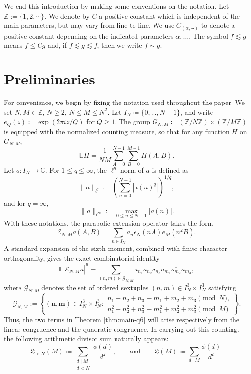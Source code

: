 \documentclass[11pt, twoside]{article}
\numberwithin{equation}{section}
\theoremstyle{definition}
\newcommand{\Z}{\mathbb Z}
\newcommand{\cG}{\mathcal G}
\begin{document}
We end this introduction by making some conventions on the notation. Let $\Z:=\{1,2,\cdots\}$. We denote by $C$ a positive constant
which is independent of the main parameters, 
but may vary from line to line. We use $C_{(\alpha,\cdots)}$ to denote a positive constant depending on the indicated parameters
$\alpha,\ldots$.  The symbol $f\lesssim g$ means $f\le C g$ and, if $f\lesssim g \lesssim f$, then we write $f\sim g$.
\section{Preliminaries}\label{sec:preliminaries}

For convenience, we begin by fixing the notation used throughout the paper. We set 
$N,M\in\Z$, $N\geq2$, $N\leq M\leq N^2$. 
Let \(I_N \coloneqq \{0,\ldots,N-1\}\), and write 
\(e_Q(z) \coloneqq \exp(2\pi i z/Q)\) for \(Q\ge 1\). 
The group \(G_{N,M} \coloneqq (\mathbb{Z}/N\mathbb{Z}) \times (\mathbb{Z}/M\mathbb{Z})\) 
is equipped with the normalized counting measure, so that for any function \(H\) on \(G_{N,M}\),
$$
\mathbb{E} H = \frac{1}{NM}\sum_{A=0}^{N-1}\sum_{B=0}^{M-1} H(A,B).
$$
Let $a:I_N\rightarrow\mathbb{C}$. For \(1\le q\le \infty\), the \(\ell^q\)-norm of $a$ is defined as
$$
\|a\|_{\ell^q}:=\left(\sum_{n=0}^{N-1}|a(n)^q|\right)^{1/q},
$$
and for $q=\infty$,
$$
\|a\|_{\ell^\infty}:=\max_{0\le n\le N-1}|a(n)|.
$$
With these notations, the parabolic extension operator takes the form
$$
\mathcal{E}_{N,M}a(A,B) = \sum_{n\in I_N} a_n e_N(nA) e_M(n^2B).
$$
A standard expansion of the sixth moment, combined with finite character orthogonality, gives the exact combinatorial identity
\begin{equation}\label{eq:six-moment-expansion}
\mathbb{E}|\mathcal{E}_{N,M}a|^6 = 
\sum_{(n,m)\in \mathcal{G}_{N,M}} 
a_{n_1}a_{n_2}a_{n_3} \overline{a_{m_1}a_{m_2}a_{m_3}},
\end{equation}
where \(\mathcal{G}_{N,M}\) denotes the set of ordered sextuples \((n,m) \in I_N^3\times I_N^3\) satisfying
\begin{equation}\label{eq:G-def}
\cG_{N,M}:=\left\{(\bm n,\bm m)\in I_N^3\times I_N^3:
\begin{array}{l}
n_1+n_2+n_3\equiv m_1+m_2+m_3\pmod N,\\
n_1^2+n_2^2+n_3^2\equiv m_1^2+m_2^2+m_3^2\pmod M
\end{array}
\right\}.
\end{equation}
Thus, the two terms in Theorem \ref{thm:main-q6} will arise respectively from the linear congruence and the quadratic congruence.
In carrying out this counting, the following arithmetic divisor sum naturally appears:
$$
\mathfrak{L}_{<N}(M) \coloneqq \sum_{\substack{d\mid M\\ d<N}} \frac{\phi(d)}{d^2},
\qquad\text{and}\qquad
\mathfrak{L}(M) \coloneqq \sum_{d\mid M} \frac{\phi(d)}{d^2}.
$$
\end{document}
